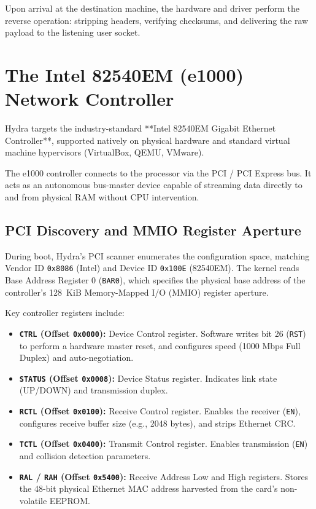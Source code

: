 Upon arrival at the destination machine, the hardware and driver perform the reverse operation: stripping headers, verifying checksums, and delivering the raw payload to the listening user socket.

\section{The Intel 82540EM (e1000) Network Controller}
\label{sec:e1000_hardware}

Hydra targets the industry-standard **Intel 82540EM Gigabit Ethernet Controller**, supported natively on physical hardware and standard virtual machine hypervisors (VirtualBox, QEMU, VMware).

The e1000 controller connects to the processor via the PCI / PCI Express bus. It acts as an autonomous bus-master device capable of streaming data directly to and from physical RAM without CPU intervention.

\subsection{PCI Discovery and MMIO Register Aperture}
During boot, Hydra's PCI scanner enumerates the configuration space, matching Vendor ID \texttt{0x8086} (Intel) and Device ID \texttt{0x100E} (82540EM). The kernel reads Base Address Register 0 (\texttt{BAR0}), which specifies the physical base address of the controller's 128~KiB Memory-Mapped I/O (MMIO) register aperture.

Key controller registers include:
\begin{itemize}
    \item \textbf{\texttt{CTRL} (Offset \texttt{0x0000}):} Device Control register. Software writes bit 26 (\texttt{RST}) to perform a hardware master reset, and configures speed (1000 Mbps Full Duplex) and auto-negotiation.
    \item \textbf{\texttt{STATUS} (Offset \texttt{0x0008}):} Device Status register. Indicates link state (UP/DOWN) and transmission duplex.
    \item \textbf{\texttt{RCTL} (Offset \texttt{0x0100}):} Receive Control register. Enables the receiver (\texttt{EN}), configures receive buffer size (e.g., 2048 bytes), and strips Ethernet CRC.
    \item \textbf{\texttt{TCTL} (Offset \texttt{0x0400}):} Transmit Control register. Enables transmission (\texttt{EN}) and collision detection parameters.
    \item \textbf{\texttt{RAL} / \texttt{RAH} (Offset \texttt{0x5400}):} Receive Address Low and High registers. Stores the 48-bit physical Ethernet MAC address harvested from the card's non-volatile EEPROM.
\end{itemize}

